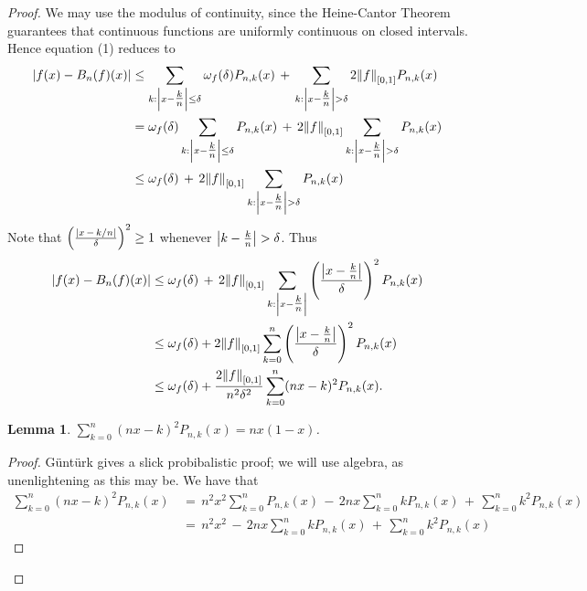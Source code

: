 \documentclass[11pt]{article}
\newtheorem{lemma}{Lemma}
\begin{document}
\begin{adjustwidth}{1cm}{}
\begin{proof}
    We may use the modulus of continuity, since the Heine-Cantor Theorem guarantees that continuous functions are uniformly continuous on closed intervals.
    \newpage
    Hence equation (1) reduces to
    \begin{align*}
      \abs{f(x) - B_{n}(f)(x)} &\le \sum\limits_{k : \abs{x - \tfrac{k}{n}} \le \delta} \omega_{f}(\delta) P_{n, k}(x) \, + \, \sum\limits_{k : \abs{x - \tfrac{k}{n}} > \delta}  2 \norm{f}_{[0, 1]} P_{n, k}(x) \\
                               &= \omega_{f}(\delta) \sum\limits_{k : \abs{x - \tfrac{k}{n}} \le \delta} P_{n, k}(x) \, + \, 2 \norm{f}_{[0, 1]} \sum\limits_{k : \abs{x - \tfrac{k}{n}} > \delta} P_{n, k}(x) \\
                               &\le \omega_{f}(\delta) \, + \, 2 \norm{f}_{[0, 1]} \sum\limits_{k : \abs{x - \tfrac{k}{n}} > \delta} P_{n, k}(x)
    \end{align*}
    Note that $\left( \frac{\abs{x \, - \, k/n}}{\delta} \right)^{2} \ge 1$ whenever $\abs{k - \tfrac{k}{n}} > \delta$. Thus
    \begin{align*}
      \abs{f(x) - B_{n}(f)(x)} &\le \omega_{f}(\delta) \, + \, 2 \norm{f}_{[0, 1]} \sum\limits_{k : \abs{x - \tfrac{k}{n}}} \left( \frac{\abs{x - \tfrac{k}{n}}}{\delta} \right)^{2} P_{n, k}(x) \\
                               &\le \omega_{f}(\delta) + 2 \norm{f}_{[0, 1]} \sum\limits_{k = 0}^{n} \left( \frac{\abs{x - \tfrac{k}{n}}}{\delta} \right)^{2} P_{n, k}(x) \\
                               &\le \omega_{f}(\delta) + \frac{2 \norm{f}_{[0, 1]}}{n^{2} \delta^{2}} \sum\limits_{k = 0}^{n} (nx - k)^{2} P_{n, k}(x).
    \end{align*}
    \begin{lemma}
      $\sum\limits_{k = 0}^{n} (nx - k)^{2} P_{n, k}(x) = nx(1 - x)$.
    \end{lemma}
    \begin{adjustwidth}{1cm}{}
      \begin{proof}\renewcommand{\qedsymbol}{}
        Güntürk gives a slick probibalistic proof; we will use algebra, as unenlightening as this may be. We have that
        \begin{align*}
          \sum\limits_{k = 0}^{n} (nx - k)^{2} P_{n, k}(x) \, &= \, n^{2} x^{2} \sum\limits_{k = 0}^{n} P_{n, k}(x) \, - \, 2nx \sum\limits_{k = 0}^{n} k P_{n, k}(x) \, + \, \sum\limits_{k = 0}^{n} k^{2} P_{n, k}(x) \\
                                                           &= \, n^{2} x^{2} \, - \, 2nx \sum\limits_{k = 0}^{n} k P_{n, k}(x) \, + \, \sum\limits_{k = 0}^{n} k^{2} P_{n, k}(x)

\end{align*}
\end{proof}
\end{adjustwidth}
\end{proof}
\end{adjustwidth}
\end{document}
